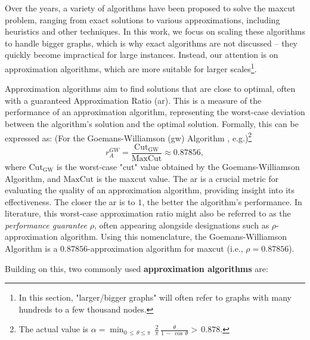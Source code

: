 
Over the years, a variety of algorithms have been proposed to solve the \acrshort{maxcut} problem, ranging from exact solutions to various approximations, including heuristics and other techniques. In this work, we focus on scaling these algorithms to handle bigger graphs, which is why exact algorithms are not discussed – they quickly become impractical for large instances. Instead, our attention is on approximation algorithms, which are more suitable for larger scales\footnote{In this section, "larger/bigger graphs" will often refer to graphs with many hundreds to a few thousand nodes.}.

Approximation algorithms aim to find solutions that are close to optimal, often with a guaranteed Approximation Ratio (\acrshort{ar}). This is a measure of the performance of an approximation algorithm, representing the worst-case deviation between the algorithm's solution and the optimal solution. Formally, this can be expressed as: (For the Goemans-Williamson (\acrshort{gw}) Algorithm \cite{GW-Algorithm}, e.g.)\footnote{The actual value is $\alpha=\operatorname*{min}_{0\,\leq\,\theta\leq\pi}\,\frac{2}{\pi}\,\frac{\theta}{1\,-\,\cos\,\theta} > \,0.878$.}$$r_A^{GW} = \frac{\text{Cut}_{\text{GW}}}{\text{MaxCut}} \approx 0.87856,$$
where $\text{Cut}_{\text{GW}}$ is the worst-case "cut" value obtained by the Goemans-Williamson Algorithm, and $\text{MaxCut}$ is the \acrshort{maxcut} value. The \acrshort{ar} is a crucial metric for evaluating the quality of an approximation algorithm, providing insight into its effectiveness. The closer the \acrshort{ar} is to $1$, the better the algorithm's performance. In literature, this worst-case approximation ratio might also be referred to as the \textit{performance guarantee} $\rho$, often appearing alongside designations such as $\rho$-approximation algorithm. Using this nomenclature, the Goemans-Williamson Algorithm is a $0.87856$-approximation algorithm for \acrshort{maxcut} (i.e., $\rho = 0.87856$).

Building on this, two commonly used \textbf{approximation algorithms} are:

